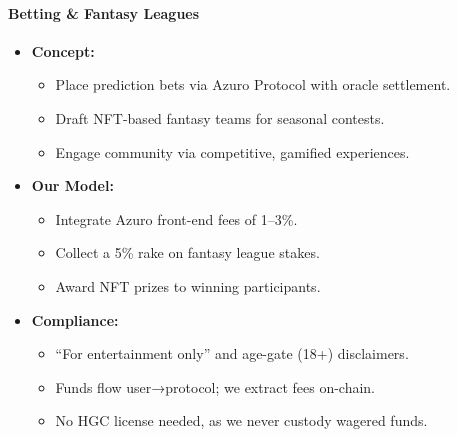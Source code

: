 \documentclass[13pt]{extarticle}
\begin{document}
\paragraph{Betting \& Fantasy Leagues}
\begin{itemize}[left=1em]
  \item \textbf{Concept:}
    \begin{itemize}[left=1.2em]
      \item Place prediction bets via Azuro Protocol with oracle settlement.
      \item Draft NFT-based fantasy teams for seasonal contests.
      \item Engage community via competitive, gamified experiences.
    \end{itemize}
  \item \textbf{Our Model:}
    \begin{itemize}[left=1.2em]
      \item Integrate Azuro front-end fees of 1–3\%.
      \item Collect a 5\% rake on fantasy league stakes.
      \item Award NFT prizes to winning participants.
    \end{itemize}
  \item \textbf{Compliance:}
    \begin{itemize}[left=1.2em]
      \item “For entertainment only” and age-gate (18+) disclaimers.
      \item Funds flow user→protocol; we extract fees on-chain.
      \item No HGC license needed, as we never custody wagered funds.
    \end{itemize}
\end{itemize}
\end{document}
